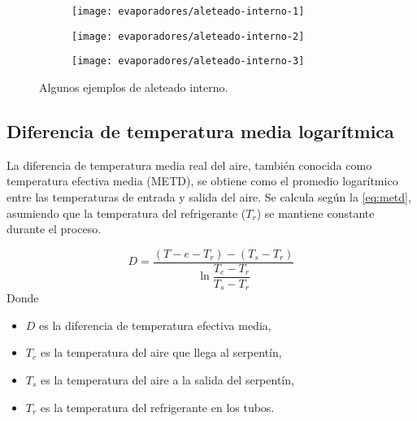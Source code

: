 				\begin{figure}[h]
					\centering
					\begin{subfigure}{0.58\linewidth}
						\centering
						\texttt{[image: evaporadores/aleteado-interno-1]}
					\end{subfigure}
					\begin{subfigure}{0.3\linewidth}
						\centering
						\texttt{[image: evaporadores/aleteado-interno-2]}
						
						\vspace{0.3cm}
						
						\texttt{[image: evaporadores/aleteado-interno-3]}
					\end{subfigure}
					
					\caption{Algunos ejemplos de aleteado interno.}
					\label{fig:aleteado-interno}
				\end{figure}
			
			\subsection{Diferencia de temperatura media logarítmica}
			
				La diferencia de temperatura media real del aire, también conocida como temperatura efectiva media (METD), se obtiene como el promedio logarítmico entre las temperaturas de entrada y salida del aire. Se calcula según la \autoref{eq:metd}, asumiendo que la temperatura del refrigerante ($T_r$) se mantiene constante durante el proceso.
				
				\begin{equation}\label{eq:metd}
					D = \dfrac{(T-e - T_r) - (T_s - T_r)}{\ln\dfrac{T_e - T_r}{T_s - T_r}}
				\end{equation}
				Donde\begin{itemize}
					\item $D$ es la diferencia de temperatura efectiva media,
					\item $T_e$ es la temperatura del aire que llega al serpentín,
					\item $T_s$ es la temperatura del aire a la salida del serpentín,
					\item $T_r$ es la temperatura del refrigerante en los tubos.
				\end{itemize}
				
%				
		
